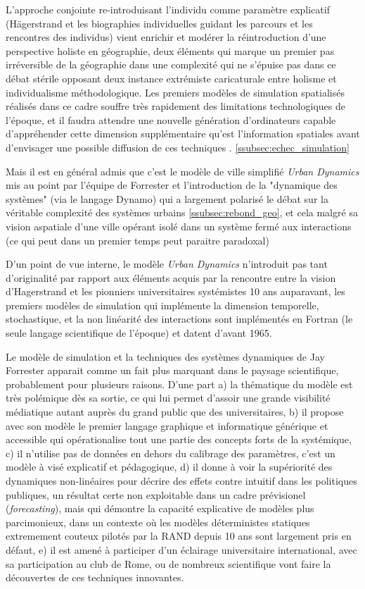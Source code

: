 L'approche conjointe re-introduisant l'individu comme paramètre explicatif (Hägerstrand et les biographies individuelles guidant les parcours et les rencontres des individus) vient enrichir et modérer la réintroduction d'une perspective holiste en géographie, deux éléments qui marque un premier pas irréversible de la géographie dans une complexité qui ne s'épuise pas dans ce débat stérile opposant deux instance extrémiste caricaturale entre holisme et individualisme méthodologique. Les premiers modèles de simulation spatialisés réalisés dans ce cadre souffre très rapidement des limitations technologiques de l'époque, et il faudra attendre une nouvelle génération d'ordinateurs capable d’appréhender cette dimension supplémentaire qu'est l'information spatiales avant d'envisager une possible diffusion de ces techniques \autocite{Marble1972}. \ref{ssubsec:echec_simulation}

Mais il est en général admis que c'est le  modèle de ville simplifié \textit{Urban Dynamics} mis au point par l'équipe de Forrester et l'introduction de la "dynamique des systèmes" (via le langage Dynamo) qui a largement polarisé le débat sur la véritable complexité des systèmes urbains \autocite{Batty2001} \ref{ssubsec:rebond_geo}, et cela malgré sa vision aspatiale d'une ville opérant isolé dans un système fermé aux interactions (ce qui peut dans un premier temps peut paraitre paradoxal)

D'un point de vue interne, le modèle \textit{Urban Dynamics} n'introduit pas tant d'originalité par rapport aux éléments acquis par la rencontre entre la vision d'Hagerstrand et les pionniers universitaires systémistes 10 ans auparavant, les premiers modèles de simulation qui implémente la dimension temporelle, stochastique, et la non linéarité des interactions sont implémentés en Fortran (le seule langage scientifique de l'époque) et datent d'avant 1965.

Le modèle de simulation et la techniques des systèmes dynamiques de Jay Forrester apparait comme un fait plus marquant dans le paysage scientifique, probablement pour plusieurs raisons. D'une part a) la thématique du modèle est très polémique dès sa sortie, ce qui lui permet d'assoir une grande visibilité médiatique autant auprès du grand public que des universitaires, b) il propose avec son modèle le premier langage graphique et informatique générique et accessible qui opérationalise tout une partie des concepts forts de la systémique, c) il n'utilise pas de données en dehors du calibrage des paramètres, c'est un modèle à visé explicatif et pédagogique, d) il donne à voir la supériorité des dynamiques non-linéaires pour décrire des effets contre intuitif dans les politiques publiques, un résultat certe non exploitable dans un cadre prévisionel (\textit{forecasting}), mais qui démontre la capacité explicative de modèles plus parcimonieux, dans un contexte où les modèles déterministes statiques extremement couteux pilotés par la RAND depuis 10 ans sont largement pris en défaut, e) il est amené à participer d'un éclairage universitaire international, avec sa participation au club de Rome, ou de nombreux scientifique vont faire la découvertes de ces techniques innovantes.

